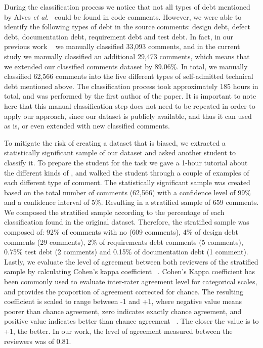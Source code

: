 During the classification process we notice that not all types of debt mentioned by Alves \emph{et al.}~\cite{Alves2014MTD} could be found in code comments. However, we were able to identify the following types of debt in the source comments: design debt, defect debt, documentation debt, requirement debt and test debt. In fact, in our previous work ~\cite{Maldonado2015MTD} we manually classified 33,093 comments, and in the current study we manually classified an additional 29,473 comments, which means that we extended our classified comments dataset by 89.06\%. In total, we manually classified 62,566 comments into the five different types of self-admitted technical debt mentioned above. The classification process took approximately 185 hours in total, and was performed by the first author of the paper. It is important to note here that this manual classification step does not need to be repeated in order to apply our approach, since our dataset is publicly available, and thus it can used as is, or even extended with new classified comments. 



To mitigate the risk of creating a dataset that is biased, we extracted a statistically significant sample of our dataset and asked another student to classify it. To prepare the student for the task we gave a 1-hour tutorial about the different kinds of \SATD, and walked the student through a couple of examples of each different type of \SATD comment. The statistically significant sample was created based on the total number of comments (62,566) with a confidence level of 99\% and a confidence interval of 5\%. Resulting in a stratified sample of 659 comments. We composed the stratified sample according to the percentage of each classification found in the original dataset. Therefore, the stratified sample was composed of: 92\% of comments with no \SATD (609 comments), 4\% of design debt comments (29 comments), 2\% of requirements debt comments (5 comments), 0.75\% test debt (2 comments) and 0.15\% of documentation debt (1 comment). Lastly, we evaluate the level of agreement between both reviewers of the stratified sample by calculating Cohen's kappa coefficient ~\cite{cohen1960coefficient}. Cohen's Kappa coefficient has been commonly used to evaluate inter-rater agreement level for categorical scales, and provides the proportion of agreement corrected for chance. The resulting coefficient is scaled to range between -1 and +1, where negative value means poorer than chance agreement, zero indicates exactly chance agreement, and positive value indicates better than chance agreement ~\cite{fleiss1973equivalence}. The closer the value is to +1, the better. In our work, the level of agreement measured between the reviewers was of 0.81.

